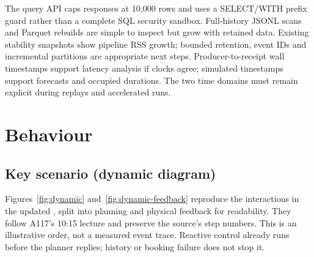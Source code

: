 \documentclass[11pt,a4paper]{article}
\begin{document}
The query API caps responses at 10,000 rows and uses a SELECT/WITH prefix guard rather than a complete SQL security sandbox. Full-history JSONL scans and Parquet rebuilds are simple to inspect but grow with retained data. Existing stability snapshots show pipeline RSS growth; bounded retention, event IDs and incremental partitions are appropriate next steps. Producer-to-receipt wall timestamps support latency analysis if clocks agree; simulated timestamps support forecasts and occupied durations. The two time domains must remain explicit during replays and accelerated runs.

\section{Behaviour}
\subsection{Key scenario (dynamic diagram)}
Figures~\ref{fig:dynamic} and~\ref{fig:dynamic-feedback} reproduce the interactions in the updated , split into planning and physical feedback for readability. They follow A117's 10:15 lecture and preserve the source's step numbers. This is an illustrative order, not a measured event trace. Reactive control already runs before the planner replies; history or booking failure does not stop it.
\end{document}
